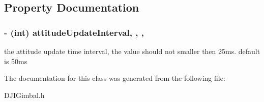 \subsection{Property Documentation}
\hypertarget{interface_d_j_i_gimbal_a3211c1147e24fbb20d09938b2a19dabb}{
\subsubsection[{attitude\+Update\+Interval}]{\setlength{\rightskip}{0pt plus 5cm}-\/ (int) attitude\+Update\+Interval\hspace{0.3cm}{\ttfamily [read]}, {\ttfamily [write]}, {\ttfamily [nonatomic]}, {\ttfamily [assign]}}}\label{interface_d_j_i_gimbal_a3211c1147e24fbb20d09938b2a19dabb}
the attitude update time interval, the value should not smaller then 25ms. default is 50ms 

The documentation for this class was generated from the following file\+:\begin{DoxyCompactItemize}
\item 
D\+J\+I\+Gimbal.\+h\end{DoxyCompactItemize}
